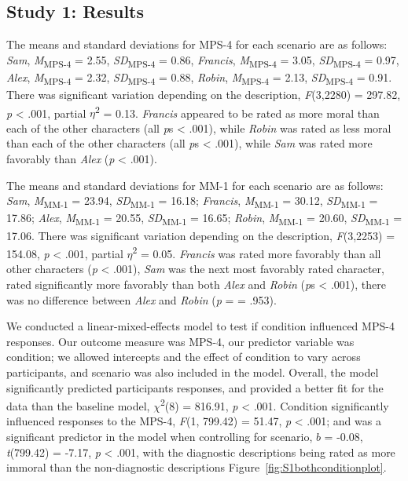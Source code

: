 \documentclass[
  english,
  man,floatsintext]{apa7}
\begin{document}
\hypertarget{study-1-results}{%
\subsection{Study 1: Results}\label{study-1-results}}

The means and standard deviations for MPS-4 for each scenario are as follows:
\emph{Sam},
\emph{M}\textsubscript{MPS-4} = 2.55, \emph{SD}\textsubscript{MPS-4} = 0.86,
\emph{Francis},
\emph{M}\textsubscript{MPS-4} = 3.05, \emph{SD}\textsubscript{MPS-4} = 0.97,
\emph{Alex},
\emph{M}\textsubscript{MPS-4} = 2.32, \emph{SD}\textsubscript{MPS-4} = 0.88,
\emph{Robin},
\emph{M}\textsubscript{MPS-4} = 2.13, \emph{SD}\textsubscript{MPS-4} = 0.91. There was significant variation depending on the description, \emph{F}(3,2280) = 297.82, \emph{p} \textless{} .001, partial \(\eta\)\textsuperscript{2} = 0.13. \emph{Francis} appeared to be rated as more moral than each of the other characters (all \emph{p}s \textless{} .001), while \emph{Robin} was rated as less moral than each of the other characters (all \emph{p}s \textless{} .001), while \emph{Sam} was rated more favorably than \emph{Alex} (\emph{p} \textless{} .001).

The means and standard deviations for MM-1 for each scenario are as follows:
\emph{Sam},
\emph{M}\textsubscript{MM-1} = 23.94, \emph{SD}\textsubscript{MM-1} = 16.18;
\emph{Francis},
\emph{M}\textsubscript{MM-1} = 30.12, \emph{SD}\textsubscript{MM-1} = 17.86;
\emph{Alex},
\emph{M}\textsubscript{MM-1} = 20.55, \emph{SD}\textsubscript{MM-1} = 16.65;
\emph{Robin},
\emph{M}\textsubscript{MM-1} = 20.60, \emph{SD}\textsubscript{MM-1} = 17.06. There was significant variation depending on the description, \emph{F}(3,2253) = 154.08, \emph{p} \textless{} .001, partial \(\eta\)\textsuperscript{2} = 0.05. \emph{Francis} was rated more favorably than all other characters (\emph{p} \textless{} .001), \emph{Sam} was the next most favorably rated character, rated significantly more favorably than both \emph{Alex} and \emph{Robin} (\emph{p}s \textless{} .001), there was no difference between \emph{Alex} and \emph{Robin} (\emph{p} = = .953).

We conducted a linear-mixed-effects model to test if condition influenced MPS-4 responses. Our outcome measure was MPS-4, our predictor variable was condition; we allowed intercepts and the effect of condition to vary across participants, and scenario was also included in the model.
Overall, the model significantly predicted participants responses, and provided a better fit for the data than the baseline model, \(\chi\)\textsuperscript{2}(8) = 816.91, \emph{p} \textless{} .001. Condition significantly influenced responses to the MPS-4, \emph{F}(1, 799.42) = 51.47, \emph{p} \textless{} .001; and was a significant predictor in the model when controlling for scenario, \(b\) = -0.08, \emph{t}(799.42) = -7.17, \emph{p} \textless{} .001, with the diagnostic descriptions being rated as more immoral than the non-diagnostic descriptions Figure~\ref{fig:S1bothconditionplot}.
\end{document}

